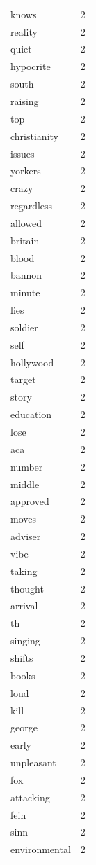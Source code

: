 \begin{tabular}{lr}
knows & 2 \\
reality & 2 \\
quiet & 2 \\
hypocrite & 2 \\
south & 2 \\
raising & 2 \\
top & 2 \\
christianity & 2 \\
issues & 2 \\
yorkers & 2 \\
crazy & 2 \\
regardless & 2 \\
allowed & 2 \\
britain & 2 \\
blood & 2 \\
bannon & 2 \\
minute & 2 \\
lies & 2 \\
soldier & 2 \\
self & 2 \\
hollywood & 2 \\
target & 2 \\
story & 2 \\
education & 2 \\
lose & 2 \\
aca & 2 \\
number & 2 \\
middle & 2 \\
approved & 2 \\
moves & 2 \\
adviser & 2 \\
vibe & 2 \\
taking & 2 \\
thought & 2 \\
arrival & 2 \\
th & 2 \\
singing & 2 \\
shifts & 2 \\
books & 2 \\
loud & 2 \\
kill & 2 \\
george & 2 \\
early & 2 \\
unpleasant & 2 \\
fox & 2 \\
attacking & 2 \\
fein & 2 \\
sinn & 2 \\
environmental & 2 \\

\end{tabular}
